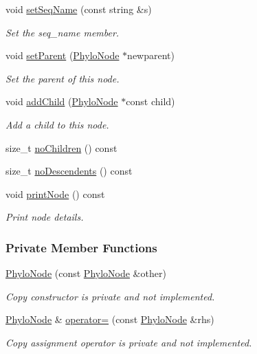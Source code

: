 \begin{DoxyCompactItemize}
void \hyperlink{classPhyloNode_a30c30789517e9f40bec24c7f665c4675}{set\-Seq\-Name} (const string \&s)
\begin{DoxyCompactList}\small\item\em \-Set the seq\-\_\-name member. \end{DoxyCompactList}\item 
void \hyperlink{classPhyloNode_a2393043d53032824ed9de2ed0429f7d7}{set\-Parent} (\hyperlink{classPhyloNode}{\-Phylo\-Node} $\ast$newparent)
\begin{DoxyCompactList}\small\item\em \-Set the parent of this node. \end{DoxyCompactList}\item 
void \hyperlink{classPhyloNode_ab27e7dc7521f80f854277ac3e7254228}{add\-Child} (\hyperlink{classPhyloNode}{\-Phylo\-Node} $\ast$const child)
\begin{DoxyCompactList}\small\item\em \-Add a child to this node. \end{DoxyCompactList}\item 
size\-\_\-t \hyperlink{classPhyloNode_a78e2019221cbe7a77c0b9d8715c51058}{no\-Children} () const 
\item 
size\-\_\-t \hyperlink{classPhyloNode_adbb02a774b9fe0125d646d96c59c9a46}{no\-Descendents} () const 
\item 
void \hyperlink{classPhyloNode_a11c02f207d02d5c75103a5aaf51bde0d}{print\-Node} () const 
\begin{DoxyCompactList}\small\item\em \-Print node details. \end{DoxyCompactList}\end{DoxyCompactItemize}
\subsubsection*{\-Private \-Member \-Functions}
\begin{DoxyCompactItemize}
\item 
\hyperlink{classPhyloNode_af635dd062f194d1314aaa2b8d2c9d6b1}{\-Phylo\-Node} (const \hyperlink{classPhyloNode}{\-Phylo\-Node} \&other)
\begin{DoxyCompactList}\small\item\em \-Copy constructor is private and not implemented. \end{DoxyCompactList}\item 
\hyperlink{classPhyloNode}{\-Phylo\-Node} \& \hyperlink{classPhyloNode_ac050dce3f4c100242c6fcd6338fb4db2}{operator=} (const \hyperlink{classPhyloNode}{\-Phylo\-Node} \&rhs)
\begin{DoxyCompactList}\small\item\em \-Copy assignment operator is private and not implemented. \end{DoxyCompactList}\end{DoxyCompactItemize}
